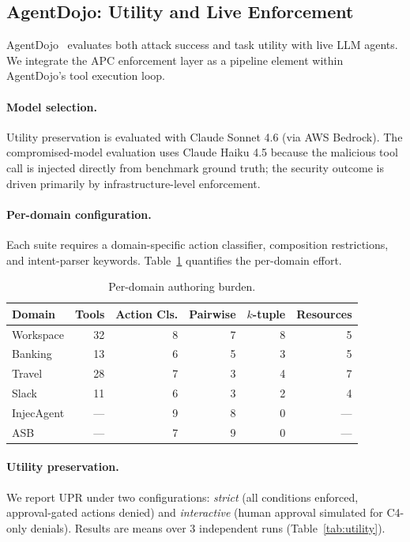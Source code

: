\documentclass[sigconf,nonacm]{acmart}
\begin{document}
\subsection{AgentDojo: Utility and Live Enforcement}\label{sec:agentdojo}

AgentDojo~\cite{debenedetti2024} evaluates both attack success and task utility with live LLM agents. We integrate the APC enforcement layer as a pipeline element within AgentDojo's tool execution loop.

\paragraph{Model selection.} Utility preservation is evaluated with Claude Sonnet 4.6 (via AWS Bedrock). The compromised-model evaluation uses Claude Haiku 4.5 because the malicious tool call is injected directly from benchmark ground truth; the security outcome is driven primarily by infrastructure-level enforcement.

\paragraph{Per-domain configuration.} Each suite requires a domain-specific action classifier, composition restrictions, and intent-parser keywords. Table~\ref{tab:authoring} quantifies the per-domain effort.

\begin{table}[t]
\centering
\footnotesize
\caption{Per-domain authoring burden.}
\label{tab:authoring}
\begin{tabular}{@{}lrrrrr@{}}
\toprule
\textbf{Domain} & \textbf{Tools} & \textbf{Action Cls.} & \textbf{Pairwise} & \textbf{$k$-tuple} & \textbf{Resources} \\
\midrule
Workspace  & 32 & 8 & 7 & 8 & 5 \\
Banking    & 13 & 6 & 5 & 3 & 5 \\
Travel     & 28 & 7 & 3 & 4 & 7 \\
Slack      & 11 & 6 & 3 & 2 & 4 \\
\midrule
InjecAgent & --- & 9 & 8 & 0 & --- \\
ASB        & --- & 7 & 9 & 0 & --- \\
\bottomrule
\end{tabular}
\end{table}

\paragraph{Utility preservation.} We report UPR under two configurations: \emph{strict} (all conditions enforced, approval-gated actions denied) and \emph{interactive} (human approval simulated for C4-only denials). Results are means over 3 independent runs (Table~\ref{tab:utility}).
\end{document}

